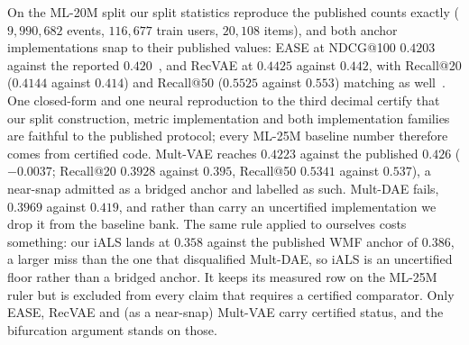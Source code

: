 \documentclass[acmsmall,review,anonymous]{acmart}
\begin{document}
On the ML-20M split our split statistics reproduce the published counts exactly ($9{,}990{,}682$ events, $116{,}677$ train users, $20{,}108$ items), and both anchor implementations snap to their published values: EASE at NDCG@100 $0.4203$ against the reported $0.420$~\citep{steck2019ease}, and RecVAE at $0.4425$ against $0.442$, with Recall@20 ($0.4144$ against $0.414$) and Recall@50 ($0.5525$ against $0.553$) matching as well~\citep{ren2020recvae}. One closed-form and one neural reproduction to the third decimal certify that our split construction, metric implementation and both implementation families are faithful to the published protocol; every ML-25M baseline number therefore comes from certified code. Mult-VAE reaches $0.4223$ against the published $0.426$ ($-0.0037$; Recall@20 $0.3928$ against $0.395$, Recall@50 $0.5341$ against $0.537$), a near-snap admitted as a bridged anchor and labelled as such. Mult-DAE fails, $0.3969$ against $0.419$, and rather than carry an uncertified implementation we drop it from the baseline bank. The same rule applied to ourselves costs something: our iALS lands at $0.358$ against the published WMF anchor of $0.386$, a larger miss than the one that disqualified Mult-DAE, so iALS is an uncertified floor rather than a bridged anchor. It keeps its measured row on the ML-25M ruler but is excluded from every claim that requires a certified comparator. Only EASE, RecVAE and (as a near-snap) Mult-VAE carry certified status, and the bifurcation argument stands on those.
\end{document}
